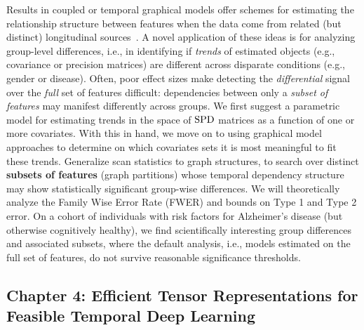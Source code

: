 Results in coupled or temporal graphical models offer schemes for estimating the relationship structure 
between features when the data come from
related (but distinct) longitudinal sources~\citep{zhou2010time,caffo}. A novel application of these ideas is for analyzing group-level differences, i.e., in identifying if {\em trends} of estimated objects (e.g., 
covariance or precision matrices) are different across disparate conditions (e.g., gender or disease).
Often, poor effect sizes make detecting the \textit{differential} signal 
over the {\em full} set of features difficult: 
dependencies between only a {\em subset of features} may manifest differently across groups.
We first suggest
a parametric model 
for estimating trends in the space of $\operatorname*{SPD}$ matrices as a function of one or more covariates.
With this in hand,
we move on to using 
graphical model approaches to determine
on which covariates sets it is most meaningful to 
fit these trends.
Generalize scan statistics to graph structures, 
to search over distinct \textbf{subsets of features} (graph partitions) whose temporal dependency structure may show statistically 
significant group-wise differences.
We will theoretically analyze the Family Wise Error Rate (FWER) and bounds on Type 1 and Type 2 error. 
On a cohort of individuals with risk factors for Alzheimer's disease (but otherwise cognitively healthy), 
we 
find scientifically interesting 
group differences and associated subsets, where the default analysis, 
i.e., models estimated on the full set of features, do not survive reasonable 
significance thresholds. 


\subsection{Chapter 4: Efficient Tensor Representations for Feasible Temporal Deep Learning}

